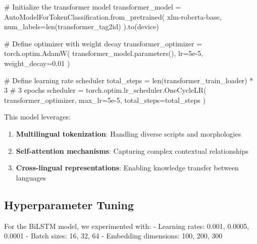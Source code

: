 \documentclass[
]{article}
\newenvironment{Shaded}{\begin{snugshade}}{\end{snugshade}}
\newcommand{\BuiltInTok}[1]{\textcolor[rgb]{0.00,0.23,0.31}{#1}}
\newcommand{\CommentTok}[1]{\textcolor[rgb]{0.37,0.37,0.37}{#1}}
\newcommand{\DecValTok}[1]{\textcolor[rgb]{0.68,0.00,0.00}{#1}}
\newcommand{\FloatTok}[1]{\textcolor[rgb]{0.68,0.00,0.00}{#1}}
\newcommand{\NormalTok}[1]{\textcolor[rgb]{0.00,0.23,0.31}{#1}}
\newcommand{\OperatorTok}[1]{\textcolor[rgb]{0.37,0.37,0.37}{#1}}
\newcommand{\StringTok}[1]{\textcolor[rgb]{0.13,0.47,0.30}{#1}}
\providecommand{\tightlist}{%
  \setlength{\itemsep}{0pt}\setlength{\parskip}{0pt}}\usepackage{longtable,booktabs,array}
\begin{document}
\begin{Shaded}
\begin{Highlighting}[]
\CommentTok{\# Initialize the transformer model}
\NormalTok{transformer\_model }\OperatorTok{=}\NormalTok{ AutoModelForTokenClassification.from\_pretrained(}
    \StringTok{\textquotesingle{}xlm{-}roberta{-}base\textquotesingle{}}\NormalTok{,}
\NormalTok{    num\_labels}\OperatorTok{=}\BuiltInTok{len}\NormalTok{(transformer\_tag2id)}
\NormalTok{).to(device)}

\CommentTok{\# Define optimizer with weight decay}
\NormalTok{transformer\_optimizer }\OperatorTok{=}\NormalTok{ torch.optim.AdamW(}
\NormalTok{    transformer\_model.parameters(),}
\NormalTok{    lr}\OperatorTok{=}\FloatTok{5e{-}5}\NormalTok{,}
\NormalTok{    weight\_decay}\OperatorTok{=}\FloatTok{0.01}
\NormalTok{)}

\CommentTok{\# Define learning rate scheduler}
\NormalTok{total\_steps }\OperatorTok{=} \BuiltInTok{len}\NormalTok{(transformer\_train\_loader) }\OperatorTok{*} \DecValTok{3}  \CommentTok{\# 3 epochs}
\NormalTok{scheduler }\OperatorTok{=}\NormalTok{ torch.optim.lr\_scheduler.OneCycleLR(}
\NormalTok{    transformer\_optimizer,}
\NormalTok{    max\_lr}\OperatorTok{=}\FloatTok{5e{-}5}\NormalTok{,}
\NormalTok{    total\_steps}\OperatorTok{=}\NormalTok{total\_steps}
\NormalTok{)}
\end{Highlighting}
\end{Shaded}

This model leverages:

\begin{enumerate}
\def\labelenumi{\arabic{enumi}.}
\tightlist
\item
  \textbf{Multilingual tokenization}: Handling diverse scripts and
  morphologies
\item
  \textbf{Self-attention mechanisms}: Capturing complex contextual
  relationships
\item
  \textbf{Cross-lingual representations}: Enabling knowledge transfer
  between languages
\end{enumerate}

\subsection{Hyperparameter Tuning}\label{hyperparameter-tuning}

For the BiLSTM model, we experimented with: - Learning rates: 0.001,
0.0005, 0.0001 - Batch sizes: 16, 32, 64 - Embedding dimensions: 100,
200, 300
\end{document}
